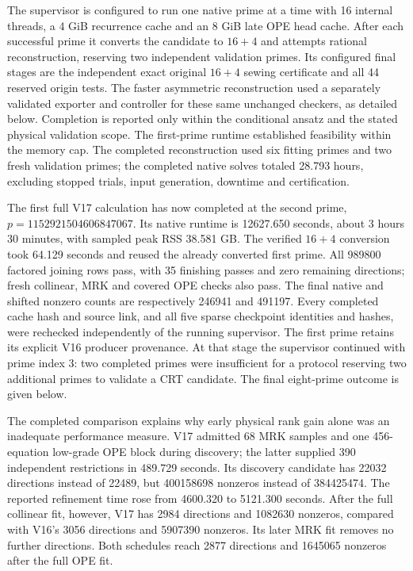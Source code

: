 \documentclass[11pt]{article}
\begin{document}
The supervisor is configured to run one native prime at a time with 16 internal threads,
a 4 GiB recurrence cache and an 8 GiB late OPE head cache. After each
successful prime it converts the candidate to $16+4$ and attempts rational
reconstruction, reserving two independent validation primes. Its configured final stages are the independent exact original
$16+4$ sewing certificate and all 44 reserved origin tests. The faster
asymmetric reconstruction used a separately validated exporter and
controller for these same unchanged checkers, as detailed below. Completion is
reported only within the conditional ansatz and the stated physical
validation scope. The first-prime runtime established feasibility within the memory cap.
The completed reconstruction used six fitting primes and two fresh
validation primes; the completed native solves totaled 28.793 hours,
excluding stopped trials, input generation, downtime and certification.

The first full V17 calculation has now completed at the second prime,
$p=1152921504606847067$. Its native runtime is 12627.650 seconds, about
3 hours 30 minutes, with sampled peak RSS 38.581 GB. The verified $16+4$
conversion took 64.129 seconds and reused the already converted first
prime. All 989800 factored joining rows pass, with 35 finishing passes
and zero remaining directions; fresh collinear, MRK and covered OPE checks
also pass. The final native and shifted nonzero counts are respectively
246941 and 491197. Every completed cache hash and source link, and all five
sparse checkpoint identities and hashes, were rechecked independently of
the running supervisor. The first prime retains its explicit V16 producer
provenance. At that stage the supervisor continued with prime index 3: two completed
primes were insufficient for a protocol reserving two additional primes
to validate a CRT candidate. The final eight-prime outcome is given below.

The completed comparison explains why early physical rank gain alone was
an inadequate performance measure. V17 admitted 68 MRK samples and one
456-equation low-grade OPE block during discovery; the latter supplied
390 independent restrictions in 489.729 seconds. Its discovery candidate
has 22032 directions instead of 22489, but 400158698 nonzeros instead of
384425474. The reported refinement time rose from 4600.320 to 5121.300
seconds. After the full collinear fit, however, V17 has 2984 directions
and 1082630 nonzeros, compared with V16's 3056 directions and 5907390
nonzeros. Its later MRK fit removes no further directions. Both schedules
reach 2877 directions and 1645065 nonzeros after the full OPE fit.
\end{document}
